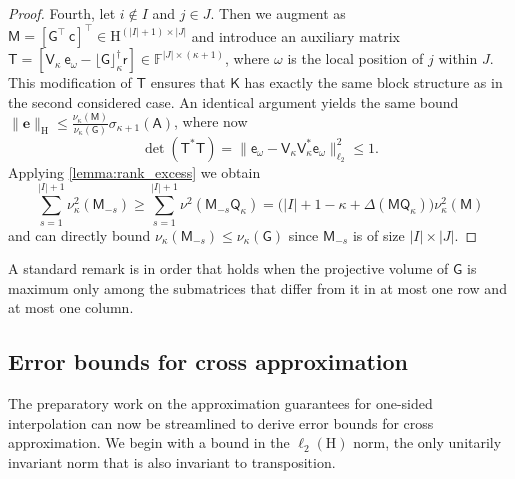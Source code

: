 \documentclass[onefignum,onetabnum]{siamart250211}
\renewenvironment{equation*}{\[}{\]\ignorespacesafterend}
\newcommand{\F}{\mathbb{F}}
\newcommand{\Hilb}{\mathrm{H}}
\newcommand{\Batrix}[1]{\bm{\Matrix{#1}}}
\newcommand{\Matrix}[1]{\mathsf{#1}}
\newcommand{\Bentry}[1]{{\bm{#1}}}
\newcommand{\trans}{\intercal}
\newcommand{\pinv}{\dagger}
\newcommand{\truncate}[3][]{#1\lfloor #2 #1\rfloor_{#3}}
\newcommand{\Index}[1]{{#1}}
\newcommand{\Norm}[3][]{#1\| #2 #1\|_{\mathrm{#3}}}
\begin{document}
\begin{proof}
Fourth, let $i \not\in \Index{I}$ and $j \in \Index{J}$.
Then we augment as $\Batrix{M} = [\Batrix{G}^\trans~\Batrix{c}]^\trans \in \Hilb^{(|\Index{I}| + 1) \times |\Index{J}|}$ and introduce an auxiliary matrix $\Matrix{T} = [\Matrix{V}_{\kappa}~\Matrix{e}_\omega - \truncate{\Batrix{G}}{\kappa}^\pinv \Batrix{r}] \in \F^{|\Index{J}| \times (\kappa + 1)}$, where $\omega$ is the local position of $j$ within $\Index{J}$.
This modification of $\Matrix{T}$ ensures that $\Batrix{K}$ has exactly the same block structure as in the second considered case.
An identical argument yields the same bound $\Norm{\Bentry{e}}{\Hilb} \leq \tfrac{\nu_{\kappa}(\Batrix{M})}{\nu_{\kappa}(\Batrix{G})} \sigma_{\kappa + 1}(\Batrix{A})$, where now
\begin{equation*}
    \det(\Matrix{T}^\ast \Matrix{T}) = \Norm{\Matrix{e}_\omega - \Matrix{V}_{\kappa} \Matrix{V}_{\kappa}^\ast \Matrix{e}_\omega}{\ell_2}^2 \leq 1.
\end{equation*}
Applying \cref{lemma:rank_excess} we obtain
\begin{equation*}
    \sum_{s = 1}^{|\Index{I}| + 1} \nu_{\kappa}^2(\Batrix{M}_{-s}) \geq \sum_{s = 1}^{|\Index{I}| + 1} \nu^2(\Batrix{M}_{-s} \Matrix{Q}_\kappa) = \Big(|\Index{I}| + 1 - \kappa + \Delta(\Batrix{M} \Matrix{Q}_\kappa) \Big) \nu_{\kappa}^2(\Batrix{M})
\end{equation*}
and can directly bound $\nu_{\kappa}(\Batrix{M}_{-s}) \leq \nu_{\kappa}(\Batrix{G})$ since $\Batrix{M}_{-s}$ is of size $|\Index{I}| \times |\Index{J}|$.
\end{proof}

A standard remark is in order that  holds when the projective volume of $\Batrix{G}$ is maximum only among the submatrices that differ from it in at most one row and at most one column.

\subsection{Error bounds for cross approximation}
The preparatory work on the approximation guarantees for one-sided interpolation can now be streamlined to derive error bounds for cross approximation.
We begin with a bound in the $\ell_2(\Hilb)$ norm, the only unitarily invariant norm that is also invariant to transposition.
\end{document}

